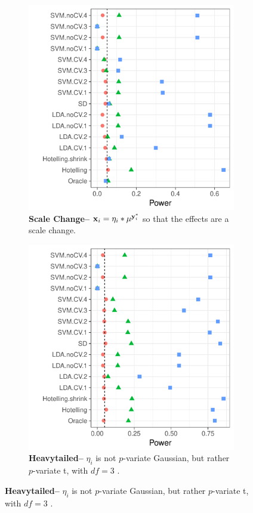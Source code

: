 \documentclass[12pt,a4paper]{article}
\begin{document}
\begin{figure}[h]
\centering
\caption{\mycaption}	
	\begin{subfigure}{.5\textwidth}
	  \centering
	  \includegraphics[width=1\linewidth]{"art/file8"}
	  \caption{\textbf{Scale Change--} $\mathbf{x}_i =  \eta_i * \mu^ {\mathbf{y}^*_i}$ so that the effects are a scale change.}  
	\label{fig:scale_change}
	\end{subfigure}%
	\begin{subfigure}{.5\textwidth}
	  \centering
	  \includegraphics[width=1\linewidth]{"art/file9"}
	  \caption{\textbf{Heavytailed--} $\eta_i$ is not $p$-variate Gaussian, but rather $p$-variate t, with $df=3$ .  } 
	\label{fig:t_null}
	\end{subfigure}
\end{figure}
\end{document}
